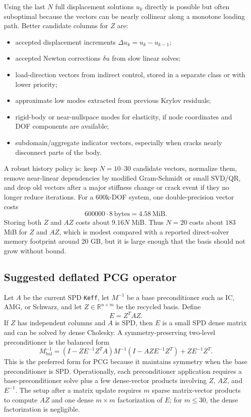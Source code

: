 \documentclass[10pt,a4paper]{article}
\newcommand{\code}[1]{\texttt{#1}}
\begin{document}
Using the last $N$ full displacement solutions $u_k$ directly is possible but often suboptimal because the vectors can be nearly collinear along a monotone loading path. Better candidate columns for $Z$ are:
\begin{itemize}
  \item accepted displacement increments $\Delta u_k=u_k-u_{k-1}$;
  \item accepted Newton corrections $\delta u$ from slow linear solves;
  \item load-direction vectors from indirect control, stored in a separate class or with lower priority;
  \item approximate low modes extracted from previous Krylov residuals;
  \item rigid-body or near-nullspace modes for elasticity, if node coordinates and DOF components are available;
  \item subdomain/aggregate indicator vectors, especially when cracks nearly disconnect parts of the body.
\end{itemize}

A robust history policy is: keep $N=10$--$30$ candidate vectors, normalize them, remove near-linear dependencies by modified Gram-Schmidt or small SVD/QR, and drop old vectors after a major stiffness change or crack event if they no longer reduce iterations. For a 600k-DOF system, one double-precision vector costs
\[
600000\cdot 8\ \mathrm{bytes}=4.58\ \mathrm{MiB}.
\]
Storing both $Z$ and $AZ$ costs about $9.16N$ MiB. Thus $N=20$ costs about $183$ MiB for $Z$ and $AZ$, which is modest compared with a reported direct-solver memory footprint around 20 GB, but it is large enough that the basis should not grow without bound.

\subsection*{Suggested deflated PCG operator}

Let $A$ be the current SPD \code{Keff}, let $M^{-1}$ be a base preconditioner such as IC, AMG, or Schwarz, and let $Z\in\mathbb{R}^{n\times m}$ be the recycled basis. Define
\[
E = Z^T A Z.
\]
If $Z$ has independent columns and $A$ is SPD, then $E$ is a small SPD dense matrix and can be solved by dense Cholesky. A symmetry-preserving two-level preconditioner is the balanced form
\[
M_{\mathrm{bal}}^{-1}
= \left(I-ZE^{-1}Z^T A\right)M^{-1}\left(I-AZE^{-1}Z^T\right)+ZE^{-1}Z^T.
\]
This is the preferred form for PCG because it maintains symmetry when the base preconditioner is SPD. Operationally, each preconditioner application requires a base-preconditioner solve plus a few dense-vector products involving $Z$, $AZ$, and $E^{-1}$. The setup after a matrix update requires $m$ sparse matrix-vector products to compute $AZ$ and one dense $m\times m$ factorization of $E$; for $m\leq 30$, the dense factorization is negligible.
\end{document}
